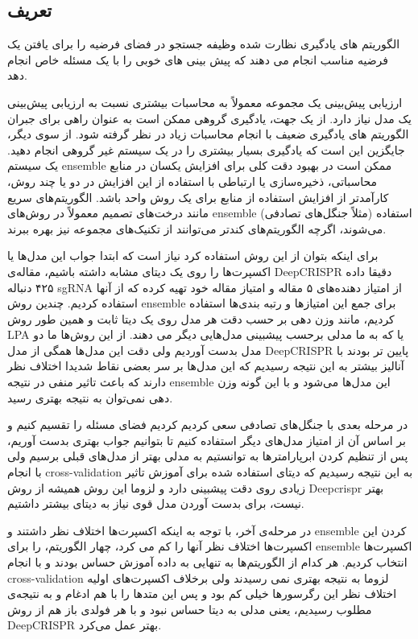 \documentclass[12pt,a4paper,BCOR=.7cm,headsepline,bibliography=totoc]{report}
\begin{document}
\subsection{تعریف}
الگوریتم های یادگیری نظارت شده وظیفه جستجو در فضای فرضیه را برای یافتن یک فرضیه مناسب انجام می دهند که پیش بینی های خوبی را با یک مسئله خاص انجام دهد.~\cite{Blockeel}

ارزیابی پیش‌بینی یک مجموعه معمولاً به محاسبات بیشتری نسبت به ارزیابی پیش‌بینی یک مدل نیاز دارد. از یک جهت، یادگیری گروهی ممکن است به عنوان راهی برای جبران الگوریتم های یادگیری ضعیف با انجام محاسبات زیاد در نظر گرفته شود. از سوی دیگر، جایگزین این است که یادگیری بسیار بیشتری را در یک سیستم غیر گروهی انجام دهید. یک سیستم ensemble ممکن است در بهبود دقت کلی برای افزایش یکسان در منابع محاسباتی، ذخیره‌سازی یا ارتباطی با استفاده از این افزایش در دو یا چند روش، کارآمدتر از افزایش استفاده از منابع برای یک روش واحد باشد. الگوریتم‌های سریع مانند درخت‌های تصمیم معمولاً در روش‌های ensemble (مثلاً جنگل‌های تصادفی) استفاده می‌شوند، اگرچه الگوریتم‌های کندتر می‌توانند از تکنیک‌های مجموعه نیز بهره ببرند.

برای اینکه بتوان از این روش‌ استفاده کرد نیاز است که ابتدا جواب این مدل‌ها یا اکسپرت‌ها را روی یک دیتای مشابه داشته باشیم، مقاله‌ی DeepCRISPR دقیقا داده ۴۲۵ دنباله sgRNA از امتیاز دهنده‌های ۵ مقاله و امتیاز مقاله خود تهیه کرده که از آنها استفاده کردیم. چندین روش ensemble برای جمع این امتیاز‌ها و رتبه بندی‌ها استفاده کردیم، مانند وزن دهی بر حسب دقت هر مدل روی یک دیتا ثابت و همین طور روش‌ LPA یا  که به ما مدلی برحسب پیشبینی مدل‌هایی دیگر می دهند. از این روش‌ها ما دو مدل بدست آوردیم ولی دقت این مدل‌ها همگی از مدل DeepCRISPR پایین تر بودند با آنالیز بیشتر به این نتیجه رسیدیم که این مدل‌ها بر سر بعضی نقاط شدیدا اختلاف نظر دارند که باعث تاثیر منفی در نتیجه ensemble این مدل‌ها می‌شود و با این گونه وزن دهی نمی‌توان به نتیجه بهتری رسید.

در مرحله بعدی با جنگل‌های تصادفی سعی کردیم کردیم فضای مسئله را تقسیم کنیم و بر اساس آن از امتیاز مدل‌های دیگر استفاده کنیم تا بتوانیم جواب بهتری بدست آوریم، پس از تنظیم کردن ابرپارامترها به توانستیم به مدلی بهتر از مدل‌های قبلی برسیم ولی با انجام cross-validation به این نتیجه رسیدیم که دیتای استفاده شده برای آموزش تاثیر زیادی روی دقت پیشبینی دارد و لزوما این روش همیشه از روش Deepcrispr بهتر نیست، برای بدست آوردن مدل قوی نیاز به دیتای بیشتر داشتیم.

در مرحله‌ی آخر، با توجه به اینکه اکسپرت‌ها اختلاف نظر داشتند و ensemble کردن این اکسپرت‌ها اختلاف نظر آنها را کم می کرد،‌ چهار الگوریتم، 
را برای ensemble اکسپرت‌ها انتخاب کردیم. هر کدام از الگوریتم‌ها به تنهایی به داده آموزش حساس بودند و با انجام cross-validation لزوما به نتیجه بهتری نمی رسیدند ولی برخلاف اکسپرت‌‌های اولیه اختلاف نظر این رگرسورها خیلی کم بود و پس این متد‌ها را با هم ادغام و به نتیجه‌ی مطلوب رسیدیم، یعنی مدلی به دیتا حساس نبود و با هر فولدی باز‌ هم از روش DeepCRISPR بهتر عمل می‌کرد. 
\end{document}
